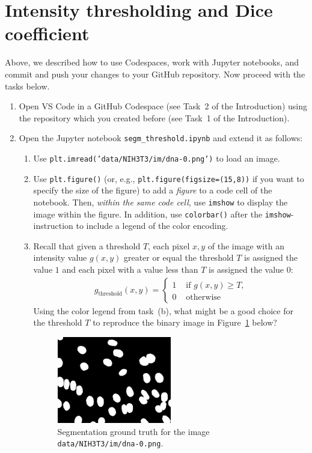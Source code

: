 \documentclass[12pt,a4paper]{article}
\begin{document}
\section{Intensity thresholding and Dice coefficient}
\label{task:threshold_segm}

Above, we described how to use Codespaces, work with Jupyter notebooks, and commit and push your changes to your GitHub repository. Now proceed with the tasks below.
\begin{enumerate}
    \item Open VS Code in a GitHub Codespace (see Task~2 of the Introduction) using the repository which you created before (see Task~1 of the Introduction).
    \item Open the Jupyter notebook \texttt{segm\_threshold.ipynb} and extend it as follows:
    \begin{enumerate}
        \item Use \texttt{plt.imread('data/NIH3T3/im/dna-0.png')} to load an image.
        \item Use \texttt{plt.figure()} (or, e.g., \texttt{plt.figure(figsize=(15,8))} if you want to specify the size of the figure) to add a \emph{figure} to a code cell of the notebook. Then, \emph{within the same code cell}, use \texttt{imshow} to display the image within the figure. In addition, use \texttt{colorbar()} after the \texttt{imshow}-instruction to include a legend of the color encoding.
        \item Recall that given a threshold $T$, each pixel $x,y$ of the image with an intensity value $g\left(x,y\right)$ greater or equal the threshold $T$ is assigned the value $1$ and each pixel with a value less than $T$ is assigned the value $0$:
        \begin{align*}
            g_\text{threshold}\left(x,y\right) = \begin{cases}
                1 & \text{ if $g\left(x,y\right) \geq T$,} \\
                0 & \text{ otherwise}
            \end{cases}
        \end{align*}
        Using the color legend from task~(b), what might be a good choice for the threshold $T$ to reproduce the binary image in Figure~\ref{fig:nih3t3-im00-bingt} below?
        \begin{figure}[h!]
            \centering
            \includegraphics[width=0.5\textwidth]{images/nih3t3-im00-bingt.png}
            \caption{Segmentation ground truth for the image \texttt{data/NIH3T3/im/dna-0.png}.}
            \label{fig:nih3t3-im00-bingt}
        \end{figure}
        

\end{enumerate}
\end{enumerate}
\end{document}

